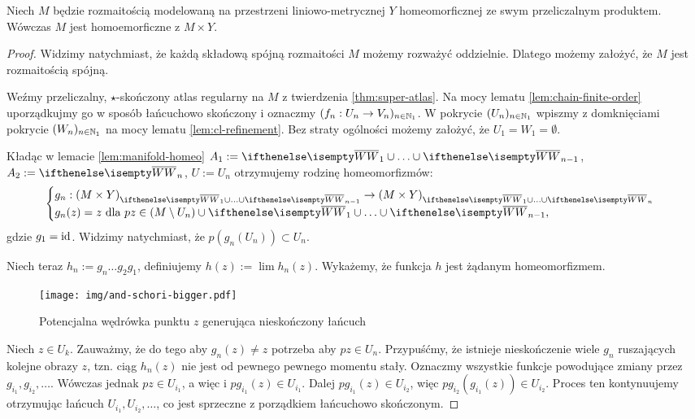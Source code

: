 \begin{thm}
  Niech $M$ będzie rozmaitością modelowaną na przestrzeni liniowo-metrycznej $Y$ homeomorficznej ze swym przeliczalnym produktem. Wówczas $M$ jest homoemorficzne z $M\times Y$.
  
  \begin{proof}
    Widzimy natychmiast, że każdą składową spójną rozmaitości $M$ możemy rozważyć oddzielnie. Dlatego możemy założyć, że $M$ jest rozmaitością spójną.
  
    Weźmy przeliczalny, $\star$-skończony atlas regularny na $M$ z twierdzenia \ref{thm:super-atlas}. Na mocy lematu \ref{lem:chain-finite-order} uporządkujmy go w sposób łańcuchowo skończony i oznaczmy $(f_n: U_n \to V_n)_{n\in{\mathbb{N}_1}}$. W pokrycie $(U_n)_{n\in{\mathbb{N}_1}}$ wpiszmy z domknięciami pokrycie $(W_n)_{n\in{\mathbb{N}_1}}$ na mocy lematu \ref{lem:cl-refinement}. Bez straty ogólności możemy założyć, że $U_1 = W_1 = \emptyset$.
    
    Kładąc w lemacie \ref{lem:manifold-homeo} $A_1 := \cl W_1 \cup\ldots\cup \cl W_{n-1}$, $A_2 := \cl W_{n}$, $U := U_n$ otrzymujemy rodzinę homeomorfizmów:
    \[
      \begin{cases}
        g_n: (M\times Y)_{\cl W_1 \cup\ldots\cup \cl W_{n-1}} \to (M\times Y)_{\cl W_1 \cup\ldots\cup \cl W_n}& \\
        g_n(z) = z\mbox{ dla }pz\in (M\setminus U_n)\cup \cl W_1 \cup\ldots\cup \cl W_{n-1},
      \end{cases}
    \]
    gdzie $g_1 = \operatorname{id}$. Widzimy natychmiast, że $p(g_n(U_n)) \subset U_n$.
    
    Niech teraz $h_n := g_n \ldots g_2 g_1$, definiujemy $h(z) := \lim h_n(z)$. Wykażemy, że funkcja $h$ jest żądanym homeomorfizmem.
            
    \begin{figure}[h!]
      \centering
      \texttt{[image: img/and-schori-bigger.pdf]}
      \caption{Potencjalna wędrówka punktu $z$ generująca nieskończony łańcuch}
    \end{figure}
    
    Niech $z \in U_k$. Zauważmy, że do tego aby $g_n(z) \neq z$ potrzeba aby $pz \in U_n$. Przypuśćmy, że istnieje nieskończenie wiele $g_n$ ruszających kolejne obrazy $z$, tzn. ciąg $h_n(z)$ nie jest od pewnego pewnego momentu stały. Oznaczmy wszystkie funkcje powodujące zmiany przez $g_{i_1}, g_{i_2}, \dots$. Wówczas jednak $pz \in U_{i_1}$, a więc i $p g_{i_1}(z) \in U_{i_1}$. Dalej $p g_{i_1}(z) \in U_{i_2}$, więc $p g_{i_2}(g_{i_1}(z)) \in U_{i_2}$. Proces ten kontynuujemy otrzymując łańcuch $U_{i_1}, U_{i_2}, \dots$, co jest sprzeczne z porządkiem łańcuchowo skończonym.


\end{proof}
\end{thm}

